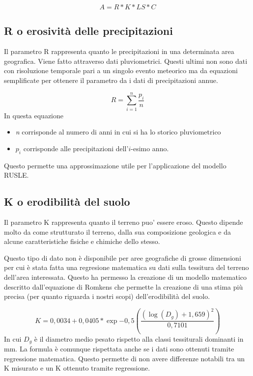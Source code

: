\begin{equation} \label{eq:main_not_P}
A = R * K * LS * C
\end{equation}

\subsection{R o erosività delle precipitazioni}
Il parametro R rappresenta quanto le precipitazioni in una determinata area geografica. Viene fatto attraverso dati pluviometrici. Questi ultimi non sono dati con risoluzione temporale pari a un singolo evento meteorico ma da equazioni semplificate per ottenere il parametro da i dati di precipitazioni annue.

\begin{equation}\label{eq:r}
	R = \sum_{i=1}^{n} \frac{p_i}{n}
\end{equation}
In questa equazione
\begin{itemize}
	\item \textit{n} corrisponde al numero di anni in cui si ha lo storico pluviometrico
	\item \textit{$p_i$} corrisponde alle precipitazioni dell'$i$-esimo anno.
\end{itemize}

Questo permette una approssimazione utile per l'applicazione del modello RUSLE.

\subsection{K o erodibilità del suolo}
Il parametro K rappresenta quanto il terreno puo' essere eroso. Questo dipende molto da come  strutturato il terreno, dalla sua composizione geologica e da alcune caratteristiche fisiche e chimiche dello stesso.

Questo tipo di dato non è disponibile per aree geografiche di grosse dimensioni per cui è stata fatta una regresione matematica su dati sulla tessitura del terreno dell'area interessata. Questo ha permesso la creazione di un modello matematico descritto dall'equazione di Romkens che permette la creazione di una stima più precisa (per quanto riguarda i nostri scopi) dell'erodibilità del suolo.

\begin{equation}\label{eq:k}
	K=0,0034 + 0,0405 * \exp{-0,5\left( \dfrac{(\log(D_g)+1,659)^2}{0,7101} \right) }
\end{equation}
In cui $D_g$ è il diametro medio pesato rispetto alla classi tessiturali dominanti in mm.
La formula è comunque rispettata anche se i dati sono ottenuti tramite regressione matematica. Questo permette di non avere differenze notabili tra un K misurato e un K ottenuto tramite regressione.


